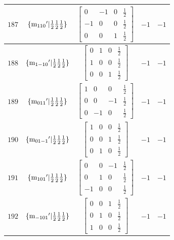 \documentclass[fleqn,8pt]{jsarticle}
\begin{document}
\begin{longtable}{ccccc}
$ 187 $ & $ \{{\rm m}_{110}{}'|\frac{1}{2} \frac{1}{2} \frac{1}{2}\} $ & $ \begin{bmatrix} 0 & -1 & 0 & \frac{1}{2} \\ -1 & 0 & 0 & \frac{1}{2} \\ 0 & 0 & 1 & \frac{1}{2} \end{bmatrix} $ & $ -1 $ & $ -1 $ \\ \hline
$ 188 $ & $ \{{\rm m}_{1-10}{}'|\frac{1}{2} \frac{1}{2} \frac{1}{2}\} $ & $ \begin{bmatrix} 0 & 1 & 0 & \frac{1}{2} \\ 1 & 0 & 0 & \frac{1}{2} \\ 0 & 0 & 1 & \frac{1}{2} \end{bmatrix} $ & $ -1 $ & $ -1 $ \\ \hline
$ 189 $ & $ \{{\rm m}_{011}{}'|\frac{1}{2} \frac{1}{2} \frac{1}{2}\} $ & $ \begin{bmatrix} 1 & 0 & 0 & \frac{1}{2} \\ 0 & 0 & -1 & \frac{1}{2} \\ 0 & -1 & 0 & \frac{1}{2} \end{bmatrix} $ & $ -1 $ & $ -1 $ \\ \hline
$ 190 $ & $ \{{\rm m}_{01-1}{}'|\frac{1}{2} \frac{1}{2} \frac{1}{2}\} $ & $ \begin{bmatrix} 1 & 0 & 0 & \frac{1}{2} \\ 0 & 0 & 1 & \frac{1}{2} \\ 0 & 1 & 0 & \frac{1}{2} \end{bmatrix} $ & $ -1 $ & $ -1 $ \\ \hline
$ 191 $ & $ \{{\rm m}_{101}{}'|\frac{1}{2} \frac{1}{2} \frac{1}{2}\} $ & $ \begin{bmatrix} 0 & 0 & -1 & \frac{1}{2} \\ 0 & 1 & 0 & \frac{1}{2} \\ -1 & 0 & 0 & \frac{1}{2} \end{bmatrix} $ & $ -1 $ & $ -1 $ \\ \hline
$ 192 $ & $ \{{\rm m}_{-101}{}'|\frac{1}{2} \frac{1}{2} \frac{1}{2}\} $ & $ \begin{bmatrix} 0 & 0 & 1 & \frac{1}{2} \\ 0 & 1 & 0 & \frac{1}{2} \\ 1 & 0 & 0 & \frac{1}{2} \end{bmatrix} $ & $ -1 $ & $ -1 $ \\
\end{longtable}
\end{document}
